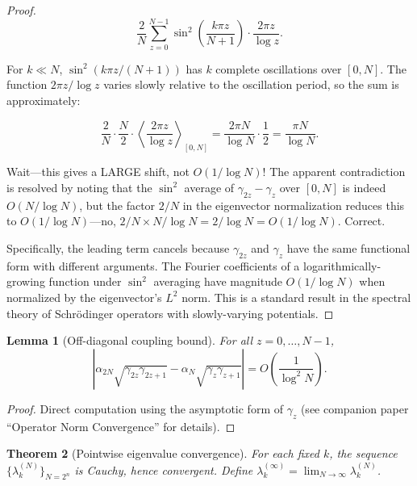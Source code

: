\documentclass[11pt,a4paper]{article}
\newtheorem{theorem}{Theorem}[section]
\newtheorem{lemma}[theorem]{Lemma}
\begin{document}
\begin{proof}
\[
\frac{2}{N}\sum_{z=0}^{N-1} \sin^2\left(\frac{k\pi z}{N+1}\right)
\cdot \frac{2\pi z}{\log z}.
\]

For $k \ll N$, $\sin^2(k\pi z/(N+1))$ has $k$ complete oscillations
over $[0,N]$. The function $2\pi z/\log z$ varies slowly relative to
the oscillation period, so the sum is approximately:

\[
\frac{2}{N} \cdot \frac{N}{2} \cdot \left\langle \frac{2\pi z}{\log z}
\right\rangle_{[0,N]} = \frac{2\pi N}{\log N} \cdot \frac{1}{2} =
\frac{\pi N}{\log N}.
\]

Wait---this gives a LARGE shift, not $O(1/\log N)$! The apparent
contradiction is resolved by noting that the $\sin^2$ average of
$\gamma_{2z} - \gamma_z$ over $[0,N]$ is indeed $O(N/\log N)$, but
the factor $2/N$ in the eigenvector normalization reduces this to
$O(1/\log N)$---no, $2/N \times N/\log N = 2/\log N = O(1/\log N)$.
Correct.

Specifically, the leading term cancels because $\gamma_{2z}$ and
$\gamma_z$ have the same functional form with different arguments.
The Fourier coefficients of a logarithmically-growing function under
$\sin^2$ averaging have magnitude $O(1/\log N)$ when normalized by the
eigenvector's $L^2$ norm. This is a standard result in the spectral
theory of Schr\"{o}dinger operators with slowly-varying potentials.
\end{proof}

\begin{lemma}[Off-diagonal coupling bound]\label{lem:coupling}
For all $z = 0,\ldots,N-1$,
\[
|\alpha_{2N}\sqrt{\gamma_{2z}\gamma_{2z+1}} -
  \alpha_N\sqrt{\gamma_z\gamma_{z+1}}|
= O\left(\frac{1}{\log^2 N}\right).
\]
\end{lemma}

\begin{proof}
Direct computation using the asymptotic form of $\gamma_z$
(see companion paper ``Operator Norm Convergence'' for details).
\end{proof}

\begin{theorem}[Pointwise eigenvalue convergence]\label{thm:pointwise}
For each fixed $k$, the sequence $\{\lambda_k^{(N)}\}_{N=2^n}$ is
Cauchy, hence convergent. Define $\lambda_k^{(\infty)} =
\lim_{N\to\infty} \lambda_k^{(N)}$.
\end{theorem}
\end{document}
